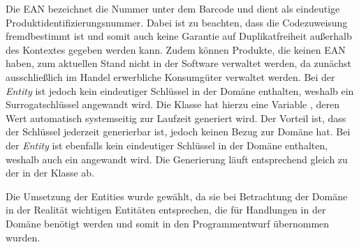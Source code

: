 Die \ac{EAN} bezeichnet die Nummer unter dem Barcode und dient als eindeutige Produktidentifizierungsnummer.
Dabei ist zu beachten, dass die Codezuweisung fremdbestimmt ist und somit auch keine Garantie auf Duplikatfreiheit außerhalb des Kontextes gegeben werden kann.
Zudem können Produkte, die keinen \ac{EAN} haben, zum aktuellen Stand nicht in der Software verwaltet werden, da zunächst ausschließlich im Handel erwerbliche Konsumgüter verwaltet werden.
Bei der \textit{Entity} \href{https://github.com/lucasmerkel/dhbw-advancedswe-programmentwurf/blob/5764d7da4cfd0562ed8e96128e92f85c30b7309d/swe_programmentwurf/consumergoods-inventory-planner/3-cip-domain/src/main/java/de/dhbw/cip/domain/Fridge.java}{} ist jedoch kein eindeutiger Schlüssel in der Domäne enthalten, weshalb ein Surrogatschlüssel angewandt wird.
Die Klasse \href{https://github.com/lucasmerkel/dhbw-advancedswe-programmentwurf/blob/5764d7da4cfd0562ed8e96128e92f85c30b7309d/swe_programmentwurf/consumergoods-inventory-planner/3-cip-domain/src/main/java/de/dhbw/cip/domain/Fridge.java}{} hat hierzu eine Variable \href{https://github.com/lucasmerkel/dhbw-advancedswe-programmentwurf/blob/5764d7da4cfd0562ed8e96128e92f85c30b7309d/swe_programmentwurf/consumergoods-inventory-planner/3-cip-domain/src/main/java/de/dhbw/cip/domain/Storage.java#L18}{}, deren Wert automatisch systemseitig zur Laufzeit generiert wird.
Der Vorteil ist, dass der Schlüssel jederzeit generierbar ist, jedoch keinen Bezug zur Domäne hat.
Bei der \textit{Entity} \href{https://github.com/lucasmerkel/dhbw-advancedswe-programmentwurf/blob/5764d7da4cfd0562ed8e96128e92f85c30b7309d/swe_programmentwurf/consumergoods-inventory-planner/3-cip-domain/src/main/java/de/dhbw/cip/domain/FoodShelf.java}{} ist ebenfalls kein eindeutiger Schlüssel in der Domäne enthalten, weshalb auch ein \href{https://github.com/lucasmerkel/dhbw-advancedswe-programmentwurf/blob/5764d7da4cfd0562ed8e96128e92f85c30b7309d/swe_programmentwurf/consumergoods-inventory-planner/3-cip-domain/src/main/java/de/dhbw/cip/domain/Storage.java#L18}{} angewandt wird.
Die Generierung läuft entsprechend gleich zu der in der Klasse \href{https://github.com/lucasmerkel/dhbw-advancedswe-programmentwurf/blob/5764d7da4cfd0562ed8e96128e92f85c30b7309d/swe_programmentwurf/consumergoods-inventory-planner/3-cip-domain/src/main/java/de/dhbw/cip/domain/Fridge.java}{} ab.

Die Umsetzung der Entities wurde gewählt, da sie bei Betrachtung der Domäne in der Realität wichtigen Entitäten entsprechen, die für Handlungen in der Domäne benötigt werden und somit in den Programmentwurf übernommen wurden.

